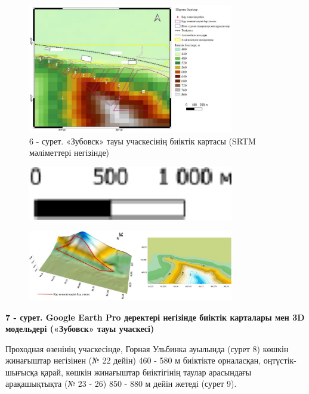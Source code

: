 \begin{figure}[H]
	\centering
	\includegraphics[width=0.8\textwidth]{media/ict2/image208}
	\caption*{6 - сурет. «Зубовск» тауы учаскесінің биіктік картасы (SRTM мәліметтері негізінде)}
\end{figure}

\begin{figure}[H]
	\centering
	\includegraphics[width=0.8\textwidth]{media/ict2/image209}
	\caption*{}
\end{figure}

\begin{figure}[H]
	\centering
	\includegraphics[width=0.8\textwidth]{media/ict2/image210}
	\caption*{}
\end{figure}


{\bfseries 7 - сурет. Google Earth Pro деректері негізінде биіктік
карталары мен 3D модельдері («Зубовск» тауы учаскесі)}

Проходная өзенінің учаскесінде, Горная Ульбинка ауылында (сурет 8)
көшкін жинағыштар негізінен (№ 22 дейін) 460 - 580 м биіктікте
орналасқан, оңтүстік-шығысқа қарай, көшкін жинағыштар биіктігінің таулар
арасындағы арақашықтықта (№ 23 - 26) 850 - 880 м дейін жетеді (сурет 9).



